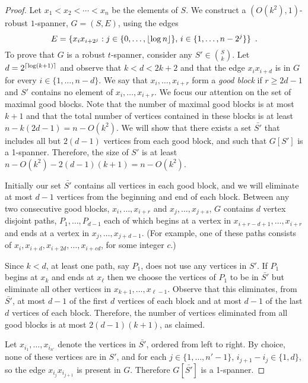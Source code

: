 \documentclass{patmorin}
\begin{document}
\begin{proof}
Let $x_1<x_2<\cdots<x_n$ be the elements of $S$.  We construct a $(O(k^2),1)$-robust $1$-spanner, $G=(S,E)$, using the edges
\[
    E = \{x_ix_{i+2^j} : j\in\{0,\ldots,{\lfloor \log n \rfloor}\},\, i\in\{1,\ldots,n-2^j\} \} \enspace .
\] 
To  prove that $G$ is a robust $t$-spanner, consider any
$S'\in\binom{S}{k}$.  Let $d=2^{{\lceil \log (k+1) \rceil}}$ and observe
that $k < d < 2k+2$ and that the edge $x_ix_{i+d}$ is in $G$ for
every $i\in\{1,\ldots,n-d\}$.  We say that $x_i,\ldots,x_{i+r}$ form
a \emph{good block} if $r\ge 2d-1$ and $S'$ contains no element of
$x_i,\ldots,x_{i+r}$.  We focus our attention on the set of maximal
good blocks.  Note that the number of maximal good blocks is at most
$k+1$ and that the total number of vertices contained in these blocks
is at least $n-k(2d-1)=n-O(k^2)$.  We will show that there exists a set
$\bar{S'}$ that includes all but $2(d-1)$ vertices from each good block,
and such that $G[S']$ is a 1-spanner.  Therefore, the size of $S'$
is at least $n-O(k^2)-2(d-1)(k+1)=n-O(k^2)$.

Initially our set $\bar{S'}$ contains all vertices in each good block,
and we will eliminate at most $d-1$ vertices from the beginning
and end of each block.  Between any two consecutive good blocks,
$x_i,\ldots,x_{i+r}$ and $x_j,\ldots,x_{j+s}$, $G$ contains $d$
vertex disjoint paths, $P_1,\ldots,P_{d-1}$ each of which begins
at a vertex in $x_{i+r-d+1},\ldots,x_{i+r}$ and ends at a vertex in
$x_{j},\ldots,x_{j+d-1}$.  (For example, one of these paths consists
of $x_i,x_{i+d},x_{i+2d},\ldots,x_{i+cd}$, for some integer $c$.)

Since $k < d$, at least one path, say $P_1$, does not use any vertices
in $S'$.  If $P_1$ begins at $x_k$ and ends at $x_\ell$ then we choose
the vertices of $P_1$ to be in $\bar{S'}$ but eliminate all other
vertices in $x_{k+1},\ldots,x_{\ell-1}$.  Observe that this eliminates,
from $\bar{S'}$, at most $d-1$ of the first $d$ vertices of each block
and at most $d-1$ of the last $d$ vertices of each block.  Therefore,
the number of vertices eliminated from all good blocks is at most
$2(d-1)(k+1)$, as claimed.

Let $x_{i_1},\ldots,x_{i_{n'}}$ denote the vertices in $\bar{S'}$,
ordered from left to right.  By choice, none of these vertices are in
$S'$, and for each $j\in\{1,\ldots,n'-1\}$, $i_{j+1}-i_{j}\in\{1,d\}$, so
the edge $x_{i_j}x_{i_{j+1}}$ is present in $G$.  Therefore $G[\bar{S'}]$
is a 1-spanner.
\end{proof}
\end{document}
